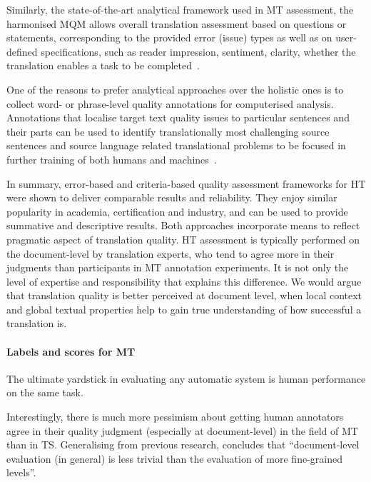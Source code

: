 Similarly, the state-of-the-art analytical framework used in MT assessment, the harmonised \gls{MQM} allows overall translation assessment based on questions or statements, corresponding to the provided error (issue) types as well as on user-defined specifications, such as reader impression, sentiment, clarity, whether the translation enables a task to be completed~\cite{DQF-MQM2015}. 

One of the reasons to prefer analytical approaches over the holistic ones is to collect word- or phrase-level quality annotations for computerised analysis. Annotations that localise target text quality issues to particular sentences and their parts can be used to identify translationally most challenging source sentences and source language related translational problems to be focused in further training of both humans and machines~\cite{Popovic2017, Kunilovskaya2022err}.

In summary, error-based and criteria-based quality assessment frameworks for HT were shown to deliver comparable results and reliability. They enjoy similar popularity in academia, certification and industry, and can be used to provide summative and descriptive results. Both approaches incorporate means to reflect pragmatic aspect of translation quality. HT assessment is typically performed on the document-level by translation experts, who tend to agree more in their judgments than participants in MT annotation experiments. It is not only the level of expertise and responsibility that explains this difference. We would argue that translation quality is better perceived at document level, when local context and global textual properties help to gain true understanding of how successful a translation is.

\paragraph{Labels and scores for MT} The ultimate yardstick in evaluating any automatic system is human performance on the same task.

Interestingly, there is much more pessimism about getting human annotators agree in their quality judgment (especially at document-level) in the field of MT than in TS. Generalising from previous research, \citet[p.64]{Specia2018a} concludes that ``document-level evaluation (in general) is less trivial than the evaluation of more fine-grained levels''.
 
